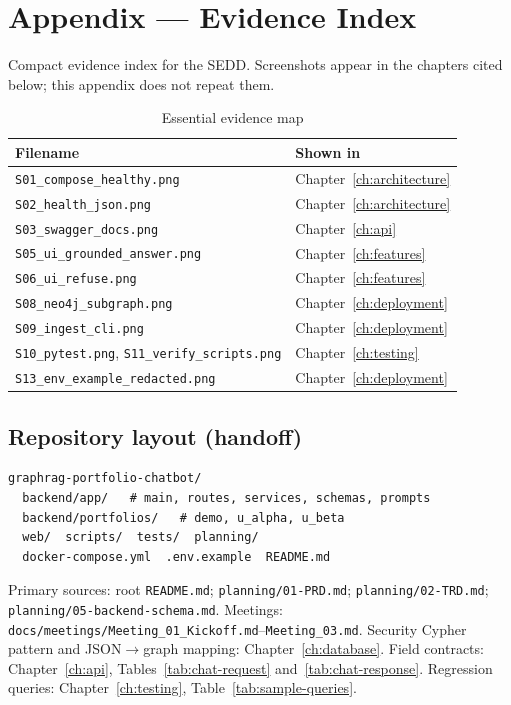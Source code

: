 \chapter{Appendix --- Evidence Index}
\label{app:screenshots}

Compact evidence index for the SEDD. Screenshots appear in the chapters cited below; this appendix does not repeat them.

\begin{table}[!htbp]
\centering
\small
\caption{Essential evidence map}
\label{tab:app-screenshots}
\begin{tabularx}{\textwidth}{@{}
  >{\raggedright\arraybackslash}p{}
  >{\raggedright\arraybackslash}X
  @{}}
\toprule
\textbf{Filename} & \textbf{Shown in} \\
\midrule
\texttt{S01\_compose\_healthy.png} & Chapter~\ref{ch:architecture} \\
\texttt{S02\_health\_json.png} & Chapter~\ref{ch:architecture} \\
\texttt{S03\_swagger\_docs.png} & Chapter~\ref{ch:api} \\
\texttt{S05\_ui\_grounded\_answer.png} & Chapter~\ref{ch:features} \\
\texttt{S06\_ui\_refuse.png} & Chapter~\ref{ch:features} \\
\texttt{S08\_neo4j\_subgraph.png} & Chapter~\ref{ch:deployment} \\
\texttt{S09\_ingest\_cli.png} & Chapter~\ref{ch:deployment} \\
\texttt{S10\_pytest.png}, \texttt{S11\_verify\_scripts.png} & Chapter~\ref{ch:testing} \\
\texttt{S13\_env\_example\_redacted.png} & Chapter~\ref{ch:deployment} \\
\bottomrule
\end{tabularx}
\end{table}

\section{Repository layout (handoff)}

\begin{verbatim}
graphrag-portfolio-chatbot/
  backend/app/   # main, routes, services, schemas, prompts
  backend/portfolios/   # demo, u_alpha, u_beta
  web/  scripts/  tests/  planning/
  docker-compose.yml  .env.example  README.md
\end{verbatim}

\noindent
Primary sources: root \texttt{README.md}; \texttt{planning/01-PRD.md}; \texttt{planning/02-TRD.md}; \texttt{planning/05-backend-schema.md}. Meetings: \texttt{docs/meetings/Meeting\_01\_Kickoff.md}--\texttt{Meeting\_03.md}. Security Cypher pattern and JSON$\rightarrow$graph mapping: Chapter~\ref{ch:database}. Field contracts: Chapter~\ref{ch:api}, Tables~\ref{tab:chat-request} and~\ref{tab:chat-response}. Regression queries: Chapter~\ref{ch:testing}, Table~\ref{tab:sample-queries}.